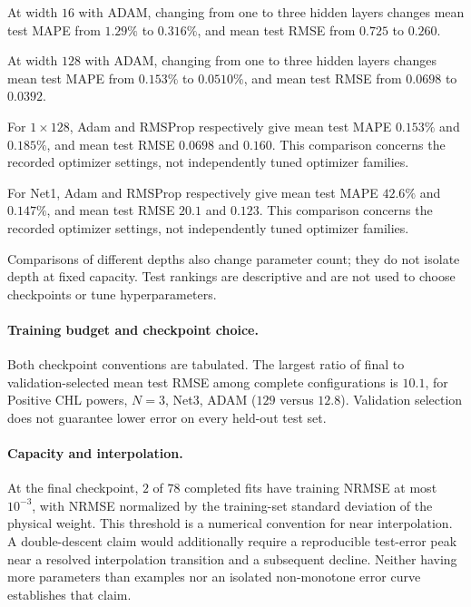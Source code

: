 At width $16$ with ADAM, changing from one to three hidden layers changes mean test MAPE from $1.29\%$ to $0.316\%$, and mean test RMSE from $0.725$ to $0.260$.

At width $128$ with ADAM, changing from one to three hidden layers changes mean test MAPE from $0.153\%$ to $0.0510\%$, and mean test RMSE from $0.0698$ to $0.0392$.

For $1\times 128$, Adam and RMSProp respectively give mean test MAPE $0.153\%$ and $0.185\%$, and mean test RMSE $0.0698$ and $0.160$. This comparison concerns the recorded optimizer settings, not independently tuned optimizer families.

For Net1, Adam and RMSProp respectively give mean test MAPE $42.6\%$ and $0.147\%$, and mean test RMSE $20.1$ and $0.123$. This comparison concerns the recorded optimizer settings, not independently tuned optimizer families.

Comparisons of different depths also change parameter count; they do not isolate depth at fixed capacity. Test rankings are descriptive and are not used to choose checkpoints or tune hyperparameters.

\paragraph{Training budget and checkpoint choice.}

Both checkpoint conventions are tabulated. The largest ratio of final to validation-selected mean test RMSE among complete configurations is $10.1$, for Positive CHL powers, $N=3$, Net3, ADAM ($129$ versus $12.8$). Validation selection does not guarantee lower error on every held-out test set.

\paragraph{Capacity and interpolation.}

At the final checkpoint, $2$ of $78$ completed fits have training NRMSE at most $10^{-3}$, with NRMSE normalized by the training-set standard deviation of the physical weight. This threshold is a numerical convention for near interpolation. A double-descent claim would additionally require a reproducible test-error peak near a resolved interpolation transition and a subsequent decline. Neither having more parameters than examples nor an isolated non-monotone error curve establishes that claim.

\clearpage
